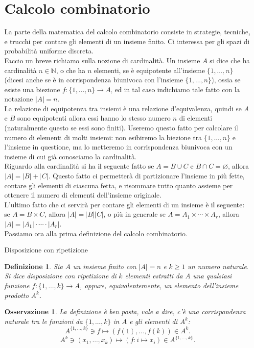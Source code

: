 \documentclass[11pt]{book}
\theoremstyle{Definizione}
\newtheorem*{mydef}{Definizione}
\theoremstyle{TeoremaProposizioneLemmaCorollario}
\theoremstyle{OsservazioneNota}
\newtheorem{myobs}{Osservazione}[section]
\newcommand{\N}{\mathbb{N}}
\begin{document}
\section{Calcolo combinatorio}
La parte della matematica del calcolo combinatorio consiste in strategie, tecniche, e trucchi per contare gli elementi di un insieme finito. Ci interessa per gli spazi di probabilità uniforme discreta.\\
Faccio un breve richiamo sulla nozione di cardinalità. Un insieme $A$ si dice che ha cardinalità $n\in \N$, o che ha $n$ elementi, se è equipotente all'insieme $\{1,\dots,n\}$ (dicesi anche se è in corrispondenza biunivoca con l'insieme $\{1,\dots,n\}$), ossia se esiste una biezione $f:\{1,\dots,n\}\longrightarrow A$, ed in tal caso indichiamo tale fatto con la notazione $|A| = n$.\\
La relazione di equipotenza tra insiemi è una relazione d'equivalenza, quindi se $A$ e $B$ sono equipotenti allora essi hanno lo stesso numero $n$ di elementi (naturalmente questo se essi sono finiti). Useremo questo fatto per calcolare il numero di elementi di molti insiemi: non esibiremo la biezione tra $\{1,\dots,n\}$ e l'insieme in questione, ma lo metteremo in corrispondenza biunivoca con un insieme di cui già conosciamo la cardinalità.\\
Riguardo alla cardinalità si ha il seguente fatto se $A = B \cup C$ e $B\cap C = \varnothing$, allora $|A| = |B|+|C|$. Questo fatto ci permetterà di partizionare l'insieme in più fette, contare gli elementi di ciascuna fetta, e risommare tutto quanto assieme per ottenere il numero di elementi dell'insieme originale.\\
L'ultimo fatto che ci servirà per contare gli elementi di un insieme è il seguente: se $A = B\times C$, allora $|A| = |B||C|$, o più in generale se $A = A_1 \times \cdots \times A_r$, allora $|A| = |A_1|\cdot \cdots \cdot |A_r|$.\\
Passiamo ora alla prima definizione del calcolo combinatorio.
\begin{boxdef}{Disposizione con ripetizione}
\begin{mydef}
Sia $A$ un insieme finito con $|A| = n$ e $k \geq 1$ un numero naturale. Si dice disposizione con ripetizione di $k$ elementi estratti da $A$ una qualsiasi funzione $f:\{1,\dots,k\}\longrightarrow A$, oppure, equivalentemente, un elemento dell'insieme prodotto $A^k$. 
\end{mydef}
\end{boxdef}
\begin{myobs}
La definizione è ben posta, vale a dire, c'è una corrispondenza naturale tra le funzioni da $\{1,\dots,k\}$ in $A$ e gli elementi di $A^k$:
$$
A^{\{1,\dots,k\}} \ni f \longmapsto (f(1),\dots,f(k))\in A^k.
$$
$$
A^k \ni (x_1,\dots,x_k) \longmapsto \left(f:i \mapsto x_i\right)\in A^{\{1,\dots,k\}}.
$$
\end{myobs}
\end{document}
